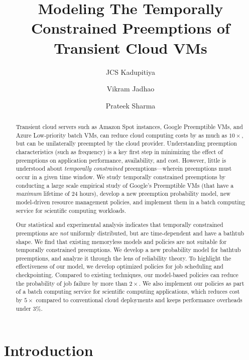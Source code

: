 \documentclass[sigconf]{acmart} %
\begin{document}
\title{Modeling The Temporally Constrained Preemptions of Transient Cloud VMs}

\author{JCS Kadupitiya}
\author{Vikram Jadhao}
\author{Prateek Sharma}

\begin{abstract}
Transient cloud servers such as Amazon Spot instances, Google
Preemptible VMs, and Azure Low-priority batch VMs, can reduce cloud
computing costs by as much as $10\times$, but can be unilaterally
preempted by the cloud provider.  Understanding preemption
characteristics (such as frequency) is a key first step in minimizing
the effect of preemptions on application performance, availability,
and cost.  However, little is understood about \emph{temporally
  constrained} preemptions---wherein preemptions must occur in a given
time window.  We study temporally constrained preemptions by
conducting a large scale empirical study of Google's Preemptible VMs
(that have a \emph{maximum} lifetime of 24 hours), develop a new
preemption probability model, new model-driven resource management
policies, and implement them in a batch computing service for
scientific computing workloads.

Our statistical and experimental analysis indicates that temporally
constrained preemptions are \emph{not} uniformly distributed, but are
time-dependent and have a bathtub shape.  We find that existing
memoryless models and policies are not suitable for temporally
constrained preemptions.  We develop a new probability model for
bathtub preemptions, and analyze it through the lens of reliability
theory.  To highlight the effectiveness of our model, we develop
optimized policies for job scheduling and checkpointing.  Compared to
existing techniques, our model-based policies can reduce the
probability of job failure by more than $2\times$.  We also implement
our policies as part of a batch computing service for scientific
computing applications, which reduces cost by $5\times$ compared to
conventional cloud deployments and keeps performance overheads under
$3\%$.
\end{abstract}

\maketitle

\section{Introduction}
\label{sec:intro}
\end{document}
